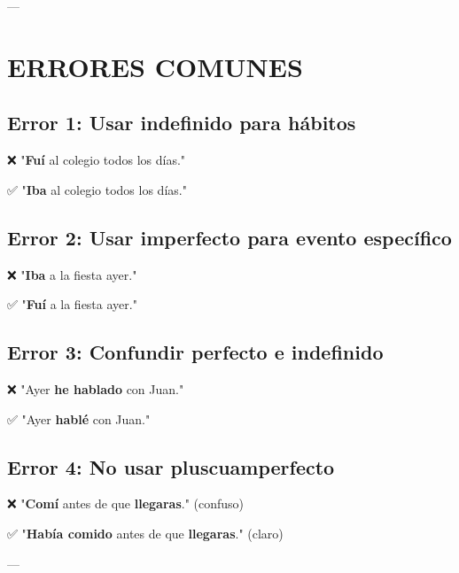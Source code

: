 \documentclass[a4paper,11pt]{article}
\begin{document}
---

\vspace{0.2cm}

\section{ERRORES COMUNES}

\vspace{0.2cm}

\subsection{Error 1: Usar indefinido para hábitos}

❌ "\textbf{Fuí} al colegio todos los días."

✅ "\textbf{Iba} al colegio todos los días."

\vspace{0.2cm}

\subsection{Error 2: Usar imperfecto para evento específico}

❌ "\textbf{Iba} a la fiesta ayer."

✅ "\textbf{Fuí} a la fiesta ayer."

\vspace{0.2cm}

\subsection{Error 3: Confundir perfecto e indefinido}

❌ "Ayer \textbf{he hablado} con Juan."

✅ "Ayer \textbf{hablé} con Juan."

\vspace{0.2cm}

\subsection{Error 4: No usar pluscuamperfecto}

❌ "\textbf{Comí} antes de que \textbf{llegaras}." (confuso)

✅ "\textbf{Había comido} antes de que \textbf{llegaras}." (claro)

\vspace{0.2cm}

---

\vspace{0.2cm}
\end{document}
